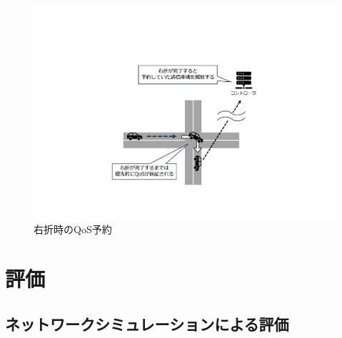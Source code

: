 \documentclass[a4paper,11pt,uplatex]{ujreport}
\begin{document}
  \begin{figure}[tb]
    \centering
    \includegraphics[width=\linewidth]{img/右折時のQoS予約2.pdf}
    \caption{右折時のQoS予約}
    \label{fig:TurnRight}
  \end{figure}







\chapter{評価}
\label{chap:評価}

\section{ネットワークシミュレーションによる評価}
\end{document}
